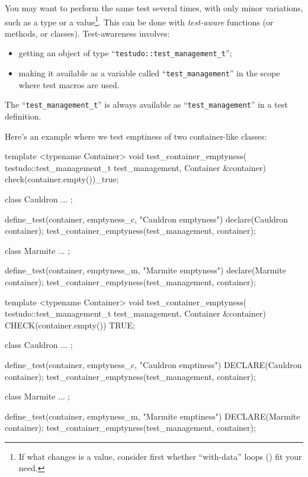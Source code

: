 \documentclass[twoside, a4paper, article]{memoir}
\begin{document}
You may want to perform the same test several times, with only minor
variations, such as a type or a value\footnote{If what changes is a value,
  consider first whether ``with-data'' loops () fit
  your need.}.  This can be done with \emph{test-aware} functions (or methods,
or classes).  Test-awareness involves:
\begin{itemize}
\item getting an object of type ``\texttt{testudo::test\_management\_t}'';
\item making it available as a variable called ``\texttt{test\_management}'' in
  the scope where test macros are used.
\end{itemize}
The ``\texttt{test\_management\_t}'' is always available as
``\texttt{test\_management}'' in a test definition.

Here's an example where we test emptiness of two container-like classes:
\begin{cpplisting}
template <typename Container>
void test_container_emptyness(
    testudo::test_management_t test_management,
    Container &container) {
  check(container.empty())_true;
}

class Cauldron { ... };

define_test(container, emptyness_c, "Cauldron emptyness") {
  declare(Cauldron container);
  test_container_emptyness(test_management, container);
}

class Marmite { ... };

define_test(container, emptyness_m, "Marmite emptyness") {
  declare(Marmite container);
  test_container_emptyness(test_management, container);
}
\end{cpplisting}

\begin{cpplisting}
template <typename Container>
void test_container_emptyness(
    testudo::test_management_t test_management,
    Container &container)
{
  CHECK(container.empty()) TRUE;
}

class Cauldron { ... };

define_test(container, emptyness_c, "Cauldron emptiness")
{
  DECLARE(Cauldron container);
  test_container_emptyness(test_management, container);
}

class Marmite { ... };

define_test(container, emptyness_m, "Marmite emptiness")
{
  DECLARE(Marmite container);
  test_container_emptyness(test_management, container);
}
\end{cpplisting}
\end{document}
